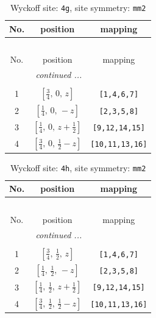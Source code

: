 \documentclass[fleqn,8pt]{jsarticle}
\begin{document}
\renewcommand{\arraystretch}{1.2}
\begin{longtable}{ccc}
\caption{Wyckoff site: {\tt 4g}, site symmetry: {\tt mm2}}
 \\
 \hline \hline
No. & position & mapping \\ \hline \endfirsthead

\multicolumn{2}{l}{\tablename\ \thetable{}} \\
 \hline \hline
No. & position & mapping \\ \hline \endhead

 \hline \hline
\multicolumn{2}{r}{\footnotesize\it continued ...} \\ \endfoot

 \hline \hline
\multicolumn{2}{r}{} \\ \endlastfoot

1 & $\left[ \frac{3}{4},\, 0,\, z \right]$ & {\tt [1,4,6,7]} \\ \hline
2 & $\left[ \frac{1}{4},\, 0,\, - z \right]$ & {\tt [2,3,5,8]} \\ \hline
3 & $\left[ \frac{1}{4},\, 0,\, z + \frac{1}{2} \right]$ & {\tt [9,12,14,15]} \\ \hline
4 & $\left[ \frac{3}{4},\, 0,\, \frac{1}{2} - z \right]$ & {\tt [10,11,13,16]} \\
\end{longtable}
\renewcommand{\arraystretch}{1.2}
\begin{longtable}{ccc}
\caption{Wyckoff site: {\tt 4h}, site symmetry: {\tt mm2}}
 \\
 \hline \hline
No. & position & mapping \\ \hline \endfirsthead

\multicolumn{2}{l}{\tablename\ \thetable{}} \\
 \hline \hline
No. & position & mapping \\ \hline \endhead

 \hline \hline
\multicolumn{2}{r}{\footnotesize\it continued ...} \\ \endfoot

 \hline \hline
\multicolumn{2}{r}{} \\ \endlastfoot

1 & $\left[ \frac{3}{4},\, \frac{1}{2},\, z \right]$ & {\tt [1,4,6,7]} \\ \hline
2 & $\left[ \frac{1}{4},\, \frac{1}{2},\, - z \right]$ & {\tt [2,3,5,8]} \\ \hline
3 & $\left[ \frac{1}{4},\, \frac{1}{2},\, z + \frac{1}{2} \right]$ & {\tt [9,12,14,15]} \\ \hline
4 & $\left[ \frac{3}{4},\, \frac{1}{2},\, \frac{1}{2} - z \right]$ & {\tt [10,11,13,16]} \\
\end{longtable}
\end{document}
